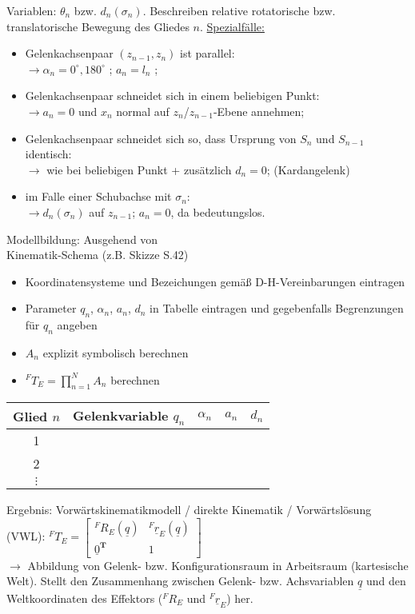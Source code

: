 \documentclass[a4paper,landscape,6pt]{article}
\newcommand{\ma}[1]{\ensuremath{\boldsymbol {#1}}}								%
\newcommand{\mat}[1]{\ensuremath{\begin{bmatrix} #1 \end{bmatrix}}}				%
\newcommand{\ul}[1]{\underline{#1}}
\begin{document}
\begin{multicols}{3}
Variablen: $\theta_n$ bzw. $d_n(\sigma_n)$. Beschreiben relative rotatorische bzw. translatorische Bewegung des Gliedes $n$.
\ul{Spezialfälle:} 
\begin{itemize}
	\item Gelenkachsenpaar $(z_{n-1},z_n)$ ist parallel:\\
		$\rightarrow \alpha_n = 0^\circ, 180^\circ$ ; $a_n = l_n$ ;
	\item Gelenkachsenpaar schneidet sich in einem beliebigen Punkt:\\
		$\rightarrow a_n = 0$ und $x_n$ normal auf $z_n$/$z_{n-1}$-Ebene annehmen;
	\item Gelenkachsenpaar schneidet sich so, dass Ursprung von $S_n$ und $S_{n-1}$ identisch:\\
		$\rightarrow$ wie bei beliebigen Punkt + zusätzlich $d_n = 0$; (Kardangelenk)
	\item  im Falle einer Schubachse mit $\sigma_n$:\\
		$\rightarrow d_n(\sigma_n)$ auf $z_{n-1}$; $a_n = 0$, da bedeutungslos.
\end{itemize}
\begin{cookbox}{Modellbildung: \footnotesize{Ausgehend von \\ \tab Kinematik-Schema (z.B. Skizze S.42)}}
	\begin{itemize}
		\item Koordinatensysteme und Bezeichungen gemäß D-H-Vereinbarungen eintragen
		\item Parameter $q_n$, $\alpha_n$, $a_n$, $d_n$ in Tabelle eintragen und gegebenfalls Begrenzungen für $q_n$ angeben
		\item $A_n$ explizit symbolisch berechnen
		\item ${}^{F}{T}_E = \prod_{n=1}^N A_n$ berechnen
	\end{itemize}
\begin{tabular}{|c| c | c | c| c|}
	\hline
Glied $n$& Gelenkvariable $q_n$ & $\alpha_n$ & $a_n$ & $d_n$ \\
	\hline
	 1 & & & & \\
	 2 & & & & \\
	$\vdots$ &  & & & \\
	\hline
\end{tabular}
\end{cookbox}
Ergebnis: Vorwärtskinematikmodell / direkte Kinematik / Vorwärtslösung (VWL):
${}^{F}{T}_E = \mat{{}^{F}{R}_E (\ul q) & {}^{F}{\ul r}_E (\ul q) \\ \ul 0^{\ma T} & 1} $\\
$\rightarrow$ Abbildung von Gelenk- bzw. Konfigurationsraum in Arbeitsraum (kartesische Welt). Stellt den Zusammenhang zwischen Gelenk- bzw. Achsvariablen $\ul q$ und den Weltkoordinaten des Effektors (${}^{F}{R}_E$ und ${}^{F}{\ul r}_E$) her.\\


\end{multicols}
\end{document}
